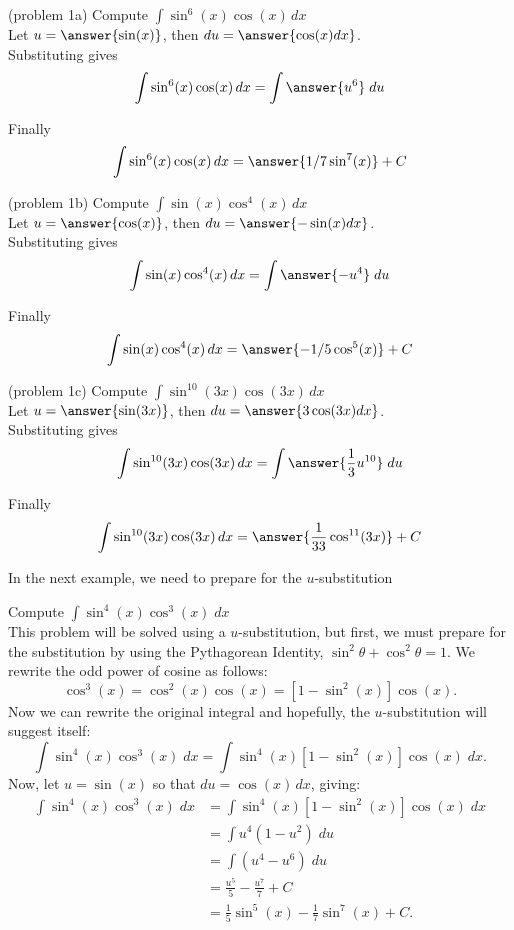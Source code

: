 \documentclass{ximera}
\begin{document}
\begin{problem}{\color{gray}(problem 1a)}
Compute $\displaystyle{\int \sin^6(x)\cos(x) \, dx}$\\
Let $u = \answer{\sin(x)}$, \; then $du = \answer{\cos(x) dx}$.\\
Substituting gives
\[
\int \sin^6(x)\cos(x) \, dx = \int \answer{u^6} \; du
\]

Finally
\[
\int \sin^{6}(x)\cos(x) \, dx = \answer{1/7 \sin^7(x)} + C
\]

\end{problem}


\begin{problem}{\color{gray}(problem 1b)} Compute $\displaystyle{\int \sin(x)\cos^4(x) \, dx}$\\

Let $u = \answer{\cos(x)}$, \; then $du = \answer{-\sin(x) dx}$.\\
Substituting gives 
\[
\int \sin(x)\cos^4(x) \, dx = \int \answer{-u^4} \; du
\]

Finally 
\[
\int \sin(x)\cos^4(x) \, dx = \answer{-1/5 \cos^5(x)} + C
\]
\end{problem}


\begin{problem}{\color{gray}(problem 1c)}
Compute $\displaystyle{\int \sin^{10}(3x)\cos(3x) \, dx}$\\
Let $u = \answer{\sin(3x)}$, \; then $du = \answer{3\cos(3x) dx}$.\\
Substituting gives 
\[
\int \sin^{10}(3x)\cos(3x) \, dx = \int \answer{\frac13 u^{10}} \; du
\]

Finally
\[
\int \sin^{10}(3x)\cos(3x) \, dx = \answer{\frac{1}{33} \cos^{11}(3x)} + C
\]

\end{problem}


In the next example, we need to prepare for the $u$-substitution 

\begin{example}[example 2]
Compute $\displaystyle{\int \sin^4(x)\cos^3(x) \; dx}$\\
This problem will be solved using a $u$-substitution, but first, we must
prepare for the substitution by using the Pythagorean 
Identity, $\sin^2 \theta + \cos^2 \theta = 1$. We rewrite the odd power of cosine as follows:
\[
\cos^3(x) = \cos^2(x) \cos(x) = \left[1 - \sin^2(x)\right] \cos(x).
\]
Now we can rewrite the original integral and hopefully, the $u$-substitution will suggest itself:
\[
\int \sin^4(x)\cos^3(x) \; dx = \int \sin^4(x)\left[1 - \sin^2(x)\right] \cos(x) \; dx.
\]
Now, let $u = \sin(x)$ so that  $du = \cos(x) \, dx$, giving:
\begin{align*}
\int \sin^4(x)\cos^3(x) \; dx &= \int \sin^4(x)\left[1 - \sin^2(x)\right] \cos(x) \; dx\\
   &= \int u^4 (1-u^2) \; du\\
   &= \int (u^4 -u^6) \; du\\
  &= \frac{u^5}{5} - \frac{u^7}{7} + C \\
  &= \frac15 \sin^5(x) - \frac17 \sin^7(x) + C.
\end{align*}
  
\end{example}
\end{document}
